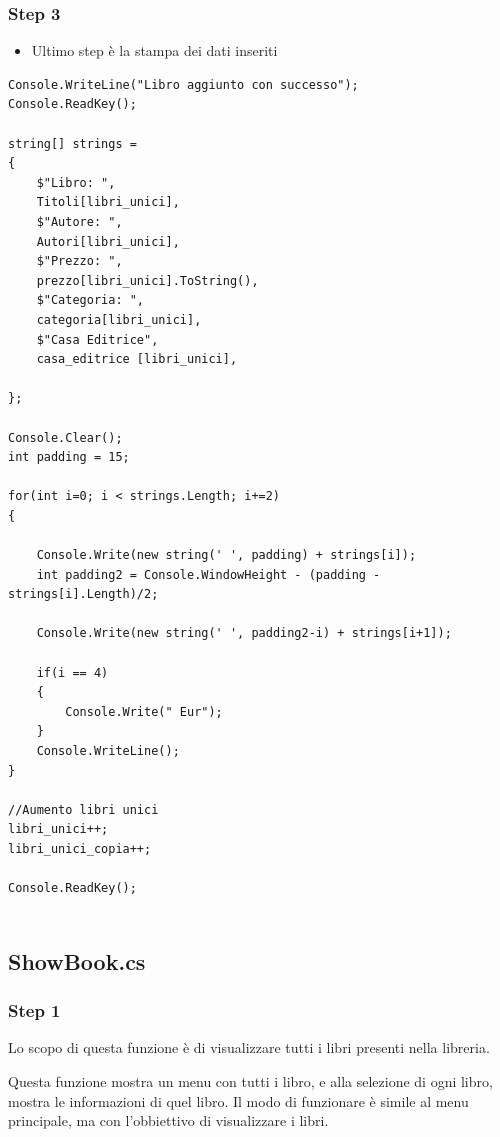 \documentclass[a4paper,12pt]{article}
\begin{document}
\subsubsection{Step 3}
\begin{itemize}
    \item Ultimo step è la stampa dei dati inseriti
\end{itemize}
\begin{lstlisting}[caption={Stampa dei dati inseriti}]
Console.WriteLine("Libro aggiunto con successo");
Console.ReadKey();

string[] strings =
{
    $"Libro: ",
    Titoli[libri_unici],
    $"Autore: ",
    Autori[libri_unici],
    $"Prezzo: ",
    prezzo[libri_unici].ToString(),
    $"Categoria: ",
    categoria[libri_unici],
    $"Casa Editrice",
    casa_editrice [libri_unici],
        
};

Console.Clear();
int padding = 15;

for(int i=0; i < strings.Length; i+=2)
{
        
    Console.Write(new string(' ', padding) + strings[i]);
    int padding2 = Console.WindowHeight - (padding - strings[i].Length)/2;

    Console.Write(new string(' ', padding2-i) + strings[i+1]);

    if(i == 4)
    {
        Console.Write(" Eur");
    }
    Console.WriteLine();
}

//Aumento libri unici
libri_unici++;
libri_unici_copia++;

Console.ReadKey();
    
\end{lstlisting}


\newpage

\subsection{ShowBook.cs}
\subsubsection{Step 1}
Lo scopo di questa funzione è di visualizzare tutti i libri presenti nella libreria.

Questa funzione mostra un menu con tutti i libro, e alla selezione di ogni libro, mostra le informazioni di quel libro.
Il modo di funzionare è simile al menu principale, ma con l'obbiettivo di visualizzare i libri.
\end{document}
